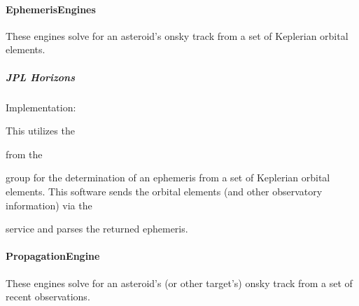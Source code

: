 \documentclass[letterpaper,11pt,english]{sphinxmanual}
\begin{document}
\paragraph{EphemerisEngines}
\label{\detokenize{technical/architecture/services_engines:ephemerisengines}}\label{\detokenize{technical/architecture/services_engines:technical-architecture-services-engines-ephemerisengines}}
\sphinxAtStartPar
These engines solve for an asteroid’s on\sphinxhyphen{}sky track from a set of
Keplerian orbital elements.


\subparagraph{JPL Horizons}
\label{\detokenize{technical/architecture/services_engines:jpl-horizons}}\label{\detokenize{technical/architecture/services_engines:technical-architecture-services-engines-ephemerisengines-jpl-horizons}}
\sphinxAtStartPar
Implementation: {\hyperref[\detokenize{code/opihiexarata.ephemeris.jplhorizons:opihiexarata.ephemeris.jplhorizons.JPLHorizonsWebAPIEngine}]{}}

\sphinxAtStartPar
This utilizes the %
\begin{footnote}[47]\sphinxAtStartFootnote
{}
%
\end{footnote}
from the %
\begin{footnote}[48]\sphinxAtStartFootnote
{}
%
\end{footnote} group for
the determination of an ephemeris from a set of Keplerian orbital elements.
This software sends the orbital elements (and other observatory information)
via the %
\begin{footnote}[49]\sphinxAtStartFootnote
{}
%
\end{footnote}
service and parses the returned ephemeris.


\paragraph{PropagationEngine}
\label{\detokenize{technical/architecture/services_engines:propagationengine}}\label{\detokenize{technical/architecture/services_engines:technical-architecture-services-engines-propagationengines}}
\sphinxAtStartPar
These engines solve for an asteroid’s (or other target’s) on\sphinxhyphen{}sky track from a
set of recent observations.
\end{document}
